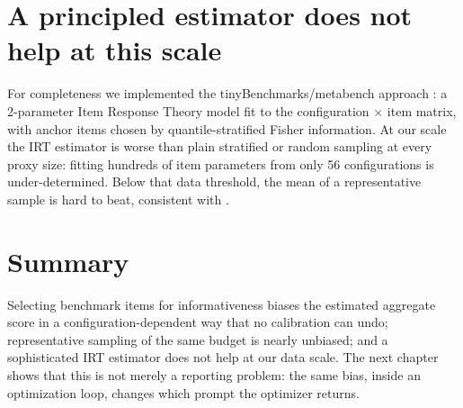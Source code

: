 \section{A principled estimator does not help at this scale}

For completeness we implemented the tinyBenchmarks/metabench approach
\citep{polo2024tinybenchmarks,metabench2024}: a 2-parameter Item Response Theory model fit to
the configuration $\times$ item matrix, with anchor items chosen by quantile-stratified
Fisher information. At our scale the IRT estimator is worse than plain stratified or random
sampling at every proxy size: fitting hundreds of item parameters from only 56 configurations
is under-determined. Below that data threshold, the mean of a representative sample is hard to
beat, consistent with \citet{missesthemark2025}.

\section{Summary}

Selecting benchmark items for informativeness biases the estimated aggregate score in a
configuration-dependent way that no calibration can undo; representative sampling of the same
budget is nearly unbiased; and a sophisticated IRT estimator does not help at our data scale.
The next chapter shows that this is not merely a reporting problem: the same bias, inside an
optimization loop, changes which prompt the optimizer returns.
